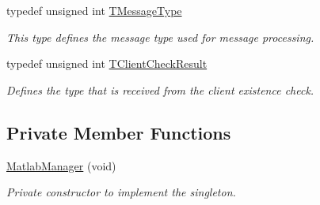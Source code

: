 \begin{DoxyCompactItemize}
typedef unsigned int \hyperlink{class_matlab_manager_a36ad68398613c0d0ede6077af22d830c}{T\-Message\-Type}
\begin{DoxyCompactList}\small\item\em This type defines the message type used for message processing. \end{DoxyCompactList}\item 
typedef unsigned int \hyperlink{class_matlab_manager_ac04dd0e7a4ab2efafe9604da5d44b318}{T\-Client\-Check\-Result}
\begin{DoxyCompactList}\small\item\em Defines the type that is received from the client existence check. \end{DoxyCompactList}\end{DoxyCompactItemize}
\subsection*{Private Member Functions}
\begin{DoxyCompactItemize}
\item 
\hyperlink{class_matlab_manager_a319d996a8872d9cdba8cf335520af258}{Matlab\-Manager} (void)
\begin{DoxyCompactList}\small\item\em Private constructor to implement the singleton. \end{DoxyCompactList}\end{DoxyCompactItemize}
